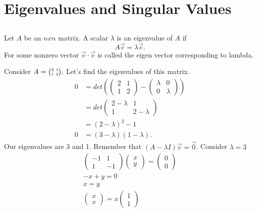 \section{Eigenvalues and Singular Values}
\subsection{}
\begin{definition}
  Let $A$ be an $nxn$ matrix. A scalar $\lambda$ is an eigenvalue of $A$ if 
  \[
  A\vec{v}=\lambda\vec{v}
  .\] 
  For some nonzero vector $\vec{v}\cdot\vec{v}$ is called the eigen vector corresponding to lambda.
\end{definition}
\begin{eg}
  Consider $A=\SmallMatrix{2&1\\1&2}$. Let's find the eigenvalues of this matrix.
    \begin{align*}
    0 &= det\left( \begin{pmatrix}2&1\\1&2\end{pmatrix}-\begin{pmatrix}\lambda&0\\0&\lambda\end{pmatrix}\right) \\
      &=det\begin{pmatrix} 2-\lambda&1\\1&2-\lambda \end{pmatrix} \\
      &=(2-\lambda)^2-1\\
    0&=(3-\lambda)(1-\lambda).
    \end{align*}
  Our eigenvalues are 3 and 1. Remember that $(A-\lambda I)\vec{v}=\vec{0}$. Consider $\lambda = 3$
  \begin{align*}
    \begin{pmatrix} -1&1\\1&-1 \end{pmatrix} \begin{pmatrix} x\\y \end{pmatrix} =\begin{pmatrix} 0\\0 \end{pmatrix} \\
    -x+y=0\\
    x=y\\
    \begin{pmatrix} x\\x \end{pmatrix} =x\begin{pmatrix} 1\\1 \end{pmatrix} 

\end{align*}
\end{eg}
